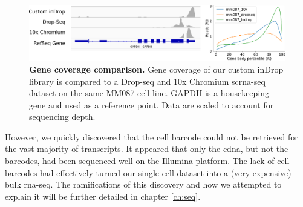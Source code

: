 
\begin{figure}[ht]
\centerfloat
\includegraphics[width=\textwidth]{./ims/indrop_genebody_combo.png}
\caption[Gene coverage comparison]{\textbf{Gene coverage comparison.} Gene coverage of our custom inDrop library is compared to a Drop-seq and 10x Chromium \acrshort{scrna-seq} dataset on the same MM087 cell line. GAPDH is a housekeeping gene and used as a reference point. Data are scaled to account for sequencing depth.}
\label{fig:indrop_genebody_combo}
\end{figure}

However, we quickly discovered that the cell barcode could not be retrieved for the vast majority of transcripts. It appeared that only the \acrshort{cdna}, but not the barcodes, had been sequenced well on the Illumina platform. The lack of cell barcodes had effectively turned our single-cell dataset into a (very expensive) bulk \acrshort{rna-seq}. The ramifications of this discovery and how we attempted to explain it will be further detailed in chapter \ref{ch:seq}.\pms



